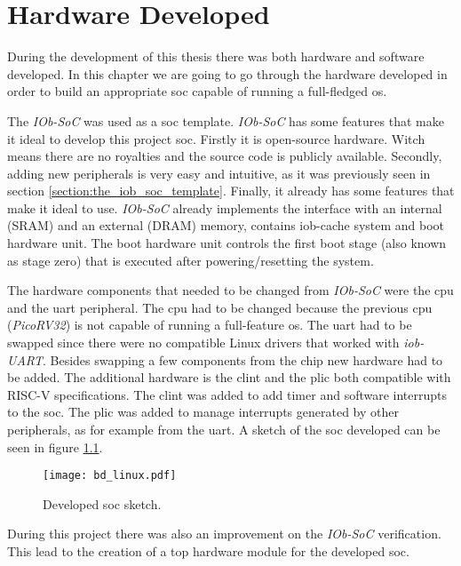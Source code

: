 \chapter{Hardware Developed}
During the development of this thesis there was both hardware and software developed. In this chapter we are going to go through the hardware developed in order to build an appropriate \acrfull{soc} capable of running a full-fledged \acrfull{os}.

The \textit{IOb-SoC} was used as a \acrfull{soc} template. \textit{IOb-SoC} has some features that make it ideal to develop this project \acrshort{soc}. Firstly it is open-source hardware. Witch means there are no royalties and the source code is publicly available. Secondly, adding new peripherals is very easy and intuitive, as it was previously seen in section \ref*{section:the_iob_soc_template}. Finally, it already has some features that make it ideal to use. \textit{IOb-SoC} already implements the interface with an internal (SRAM) and an external (DRAM) memory, contains iob-cache system and boot hardware unit. The boot hardware unit controls the first boot stage (also known as stage zero) that is executed after powering/resetting the system.

The hardware components that needed to be changed from \textit{IOb-SoC} were the \acrfull{cpu} and the \acrfull{uart} peripheral. The \acrshort{cpu} had to be changed because the previous \acrshort{cpu} (\textit{PicoRV32}) is not capable of running a full-feature \acrlong{os}. The \acrshort{uart} had to be swapped since there were no compatible Linux drivers that worked with \textit{iob-UART}. Besides swapping a few components from the chip new hardware had to be added. The additional hardware is the \acrshort{clint} and the \acrshort{plic} both compatible with RISC-V specifications. The \acrshort{clint} was added to add timer and software interrupts to the \acrshort{soc}. The \acrshort{plic} was added to manage interrupts generated by other peripherals, as for example from the \acrshort{uart}. A sketch of the \acrshort{soc} developed can be seen in figure \ref{fig:bd_linux}.

\begin{figure}[!h]
    \centering
    \texttt{[image: bd\_linux.pdf]}
    \caption{Developed \acrshort{soc} sketch.}
    \label{fig:bd_linux}
\end{figure}

During this project there was also an improvement on the \textit{IOb-SoC} verification. This lead to the creation of a top hardware module for the developed \acrlong{soc}.


